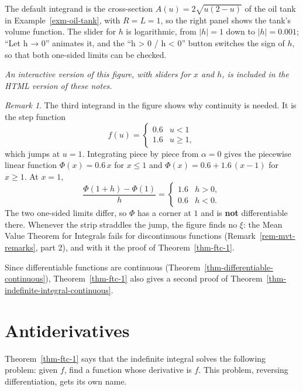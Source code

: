 \documentclass[
  letterpaper,
  DIV=11,
  numbers=noendperiod]{scrreprt}
\theoremstyle{plain}
\theoremstyle{plain}
\theoremstyle{definition}
\theoremstyle{definition}
\theoremstyle{definition}
\theoremstyle{plain}
\theoremstyle{plain}
\theoremstyle{remark}
\newtheorem{refremark}{Remark}[chapter]
\begin{document}
The default integrand is the cross-section \(A(u)=2\sqrt{u(2-u)}\) of
the oil tank in Example~\ref{exm-oil-tank}, with \(R=L=1\), so the right
panel shows the tank's volume function. The slider for \(h\) is
logarithmic, from \(\lvert h \rvert=1\) down to
\(\lvert h \rvert=0.001\); ``Let h → 0'' animates it, and the ``h
\textgreater{} 0 / h \textless{} 0'' button switches the sign of \(h\),
so that both one-sided limits can be checked.

\emph{An interactive version of this figure, with sliders for \(x\) and
\(h\), is included in the HTML version of these notes.}

\begin{refremark}
The third integrand in the figure shows why continuity is needed. It is
the step function \[
f(u) = \begin{cases} 0.6 & u<1 \\ 1.6 & u\ge1, \end{cases}
\] which jumps at \(u=1\). Integrating piece by piece from \(\alpha=0\)
gives the piecewise linear function \(\Phi(x) = 0.6\,x\) for \(x\le1\)
and \(\Phi(x) = 0.6+1.6\,(x-1)\) for \(x\ge1\). At \(x=1\), \[
\frac{\Phi(1+h)-\Phi(1)}{h} = \begin{cases} 1.6 & h>0, \\ 0.6 & h<0. \end{cases}
\] The two one-sided limits differ, so \(\Phi\) has a corner at \(1\)
and is \textbf{not} differentiable there. Whenever the strip straddles
the jump, the figure finds no \(\xi\): the Mean Value Theorem for
Integrals fails for discontinuous functions
(Remark~\ref{rem-mvt-remarks}, part 2), and with it the proof of
Theorem~\ref{thm-ftc-1}.

\label{rem-ftc-needs-continuity}

\end{refremark}

Since differentiable functions are continuous
(Theorem~\ref{thm-differentiable-continuous}), Theorem~\ref{thm-ftc-1}
also gives a second proof of
Theorem~\ref{thm-indefinite-integral-continuous}.

\section{Antiderivatives}\label{antiderivatives}

Theorem~\ref{thm-ftc-1} says that the indefinite integral solves the
following problem: given \(f\), find a function whose derivative is
\(f\). This problem, reversing differentiation, gets its own name.
\end{document}
